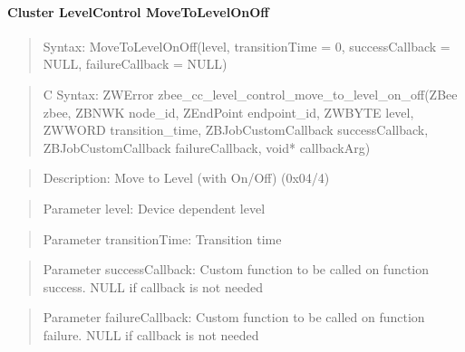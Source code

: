 \paragraph{Cluster LevelControl MoveToLevelOnOff}
\begin{quote}Syntax: MoveToLevelOnOff(level, transitionTime = 0, successCallback = NULL, failureCallback = NULL)\end{quote}
\begin{quote}C Syntax: ZWError zbee\_cc\_level\_control\_move\_to\_level\_on\_off(ZBee zbee, ZBNWK node\_id, ZEndPoint endpoint\_id, ZWBYTE level, ZWWORD transition\_time, ZBJobCustomCallback successCallback, ZBJobCustomCallback failureCallback, void* callbackArg)\end{quote}
\begin{quote}Description: Move to Level (with On/Off) (0x04/4)\end{quote}
\begin{quote}Parameter level: Device dependent level\end{quote}
\begin{quote}Parameter transitionTime: Transition time\end{quote}
\begin{quote}Parameter successCallback: Custom function to be called on function success. NULL if callback is not needed\end{quote}
\begin{quote}Parameter failureCallback: Custom function to be called on function failure. NULL if callback is not needed\end{quote}



